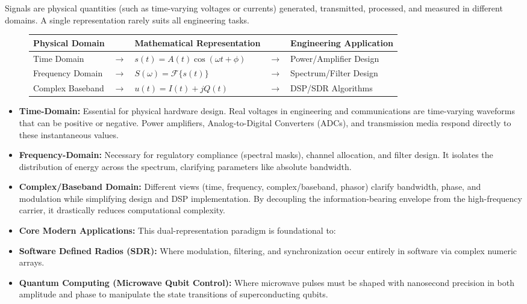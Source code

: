 \documentclass[
]{article}
\providecommand{\tightlist}{%
  \setlength{\itemsep}{0pt}\setlength{\parskip}{0pt}}
\begin{document}
Signals are physical quantities (such as time-varying voltages or
currents) generated, transmitted, processed, and measured in different
domains. A single representation rarely suits all engineering tasks.
\begin{figure}[h]
\centering
\renewcommand{\arraystretch}{1.5}
\begin{tabular}{|l|c|l|c|l|}
\hline
\textbf{Physical Domain} & & \textbf{Mathematical Representation} & & \textbf{Engineering Application} \\
\hline
Time Domain & $\longrightarrow$ & $s(t) = A(t)\cos(\omega t + \phi)$ & $\longrightarrow$ & Power/Amplifier Design \\
\hline
Frequency Domain & $\longrightarrow$ & $S(\omega) = \mathcal{F}\{s(t)\}$ & $\longrightarrow$ & Spectrum/Filter Design \\
\hline
Complex Baseband & $\longrightarrow$ & $u(t) = I(t) + jQ(t)$ & $\longrightarrow$ & DSP/SDR Algorithms \\
\hline
\end{tabular}
\end{figure}

\begin{itemize}
\tightlist
\item
  \textbf{Time-Domain:} Essential for physical hardware design. Real
  voltages in engineering and communications are time-varying waveforms
  that can be positive or negative. Power amplifiers, Analog-to-Digital
  Converters (ADCs), and transmission media respond directly to these
  instantaneous values.
\item
  \textbf{Frequency-Domain:} Necessary for regulatory compliance
  (spectral masks), channel allocation, and filter design. It isolates
  the distribution of energy across the spectrum, clarifying parameters
  like absolute bandwidth.
\item
  \textbf{Complex/Baseband Domain:} Different views (time, frequency,
  complex/baseband, phasor) clarify bandwidth, phase, and modulation
  while simplifying design and DSP implementation. By decoupling the
  information-bearing envelope from the high-frequency carrier, it
  drastically reduces computational complexity.
\item
  \textbf{Core Modern Applications:} This dual-representation paradigm
  is foundational to:
\item
  \textbf{Software Defined Radios (SDR):} Where modulation, filtering,
  and synchronization occur entirely in software via complex numeric
  arrays.
\item
  \textbf{Quantum Computing (Microwave Qubit Control):} Where microwave
  pulses must be shaped with nanosecond precision in both amplitude and
  phase to manipulate the state transitions of superconducting qubits.
\end{itemize}
\end{document}
